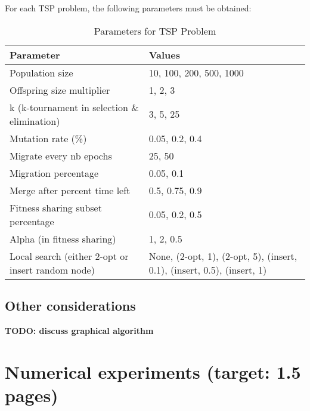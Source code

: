 \documentclass[a4paper,10pt]{article}
\newcommand{\ReplaceMe}[1]{{\color{blue}#1}}
\newcommand{\RemoveMe}[1]{{\color{purple}#1}}
\begin{document}
	For each TSP problem, the following parameters must be obtained:
	\begin{table}[ht]
		\centering
		\begin{tabularx}{0.9\textwidth}{|X|X|}
			\hline
			\textbf{Parameter} & \textbf{Values} \\
			\hline
			Population size & 10, 100, 200, 500, 1000 \\
			\hline
			Offspring size multiplier & 1, 2, 3 \\
			\hline
			k (k-tournament in selection \& elimination) & 3, 5, 25 \\
			\hline
			Mutation rate (\%) & 0.05, 0.2, 0.4 \\
			\hline
			Migrate every nb epochs & 25, 50 \\
			\hline
			Migration percentage & 0.05, 0.1 \\
			\hline
			Merge after percent time left & 0.5, 0.75, 0.9 \\
			\hline
			Fitness sharing subset percentage & 0.05, 0.2, 0.5 \\
			\hline
			Alpha (in fitness sharing) & 1, 2, 0.5 \\
			\hline
			Local search (either 2-opt or insert random node) & None, (2-opt, 1), (2-opt, 5), (insert, 0.1), (insert, 0.5), (insert, 1) \\
			\hline
		\end{tabularx}
		\caption{Parameters for TSP Problem}
	\end{table}

	

\subsection{Other considerations}\label{sec_oth}
\textbf{TODO: discuss graphical algorithm}


\section{Numerical experiments (target: 1.5 pages)}
\end{document}

